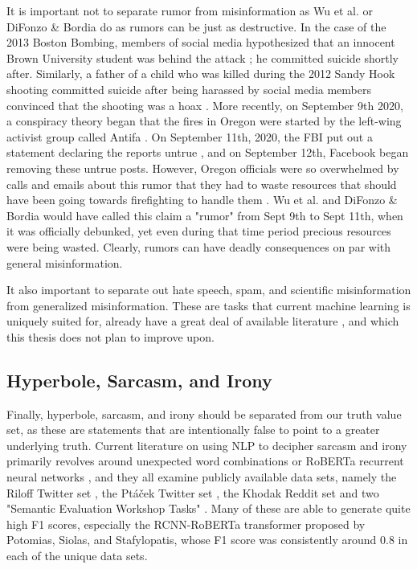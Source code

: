 \documentclass[NETN,manuscript]{stjour-new}
\begin{document}
It is important not to separate rumor from misinformation as Wu et al. or DiFonzo \& Bordia do as rumors can be just as destructive. In the case of the 2013 Boston Bombing, members of social media hypothesized that an innocent Brown University student was behind the attack \citep{starbird2014rumors}; he committed suicide shortly after. Similarly, a father of a child who was killed during the 2012 Sandy Hook shooting committed suicide after being harassed by social media members convinced that the shooting was a hoax \citep{williamson2019alex}. More recently, on September 9th 2020, a conspiracy theory began that the fires in Oregon were started by the left-wing activist group called Antifa \citep{robinson2020oregon}. On September 11th, 2020, the FBI put out a statement declaring the reports untrue \citep{fbi2020portland}, and on September 12th, Facebook began removing these untrue posts. However, Oregon officials were so overwhelmed by calls and emails about this rumor that they had to waste resources that should have been going towards firefighting to handle them \citep{wilson2020oregon}. Wu et al. and DiFonzo \& Bordia would have called this claim a "rumor" from Sept 9th to Sept 11th, when it was officially debunked, yet even during that time period precious resources were being wasted. 
Clearly, rumors can have deadly consequences on par with general misinformation.

It also important to separate out hate speech, spam, and scientific misinformation from generalized misinformation. These are tasks that current machine learning is uniquely suited for, already have a great deal of available literature \citep{xu2019exploiting,wang2010detecting,ahmed2018detecting,al2019spam,oriola2020evaluating,gaydhani2018detecting,al2020lies,farrell2019evidence}, and which this thesis does not plan to improve upon. 

\subsection{Hyperbole, Sarcasm, and Irony}
Finally, hyperbole, sarcasm, and irony should be separated from our truth value set, as these are statements that are intentionally false to point to a greater underlying truth. 
Current literature on using NLP to decipher sarcasm and irony primarily revolves around unexpected word combinations \citep{barbieri2014modelling,buschmeier2014impact,ghosh2015sarcastic} or RoBERTa recurrent neural networks \citep{potamias2020transformer}, and they all examine publicly available data sets, namely the Riloff Twitter set \citep{riloff2013sarcasm}, the Pt{\'a}{\v{c}}ek Twitter set \citep{ptavcek2014sarcasm}, the Khodak Reddit set \citep{khodak2017large} and two "Semantic Evaluation Workshop Tasks" \citep{van2018semeval,ghosh2015semeval}. Many of these are able to generate quite high F1 scores, especially the RCNN-RoBERTa transformer proposed by Potomias, Siolas, and Stafylopatis, whose F1 score was consistently around 0.8 in each of the unique data sets. 
\end{document}
